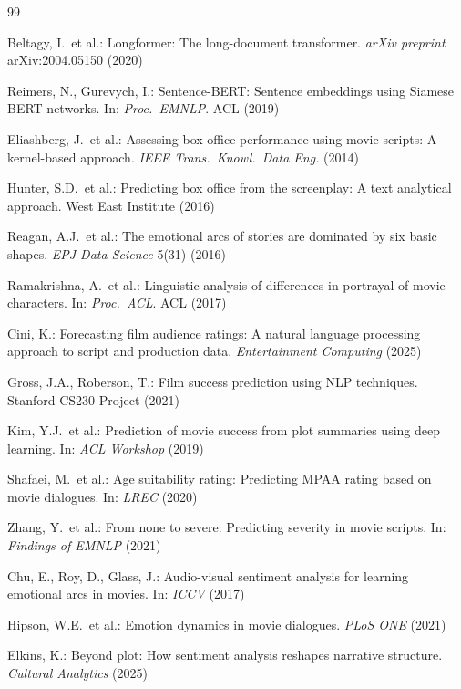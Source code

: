 \documentclass[runningheads]{llncs}
\begin{document}
\begin{thebibliography}{99}

Beltagy, I.\ et al.: Longformer: The long-document transformer.
\emph{arXiv preprint} arXiv:2004.05150 (2020)

Reimers, N., Gurevych, I.: Sentence-BERT: Sentence embeddings
using Siamese BERT-networks. In: \emph{Proc.\ EMNLP}. ACL (2019)

Eliashberg, J.\ et al.: Assessing box office performance using
movie scripts: A kernel-based approach. \emph{IEEE Trans.\ Knowl.\
Data Eng.} (2014)

Hunter, S.D.\ et al.: Predicting box office from the screenplay:
A text analytical approach. West East Institute (2016)

Reagan, A.J.\ et al.: The emotional arcs of stories are dominated
by six basic shapes. \emph{EPJ Data Science} 5(31) (2016)

Ramakrishna, A.\ et al.: Linguistic analysis of differences in
portrayal of movie characters. In: \emph{Proc.\ ACL}. ACL (2017)

Cini, K.: Forecasting film audience ratings: A natural language
processing approach to script and production data.
\emph{Entertainment Computing} (2025)

Gross, J.A., Roberson, T.: Film success prediction using NLP
techniques. Stanford CS230 Project (2021)

Kim, Y.J.\ et al.: Prediction of movie success from plot summaries
using deep learning. In: \emph{ACL Workshop} (2019)

Shafaei, M.\ et al.: Age suitability rating: Predicting MPAA
rating based on movie dialogues. In: \emph{LREC} (2020)

Zhang, Y.\ et al.: From none to severe: Predicting severity in
movie scripts. In: \emph{Findings of EMNLP} (2021)

Chu, E., Roy, D., Glass, J.: Audio-visual sentiment analysis for
learning emotional arcs in movies. In: \emph{ICCV} (2017)

Hipson, W.E.\ et al.: Emotion dynamics in movie dialogues.
\emph{PLoS ONE} (2021)

Elkins, K.: Beyond plot: How sentiment analysis reshapes narrative
structure. \emph{Cultural Analytics} (2025)


\end{thebibliography}
\end{document}
